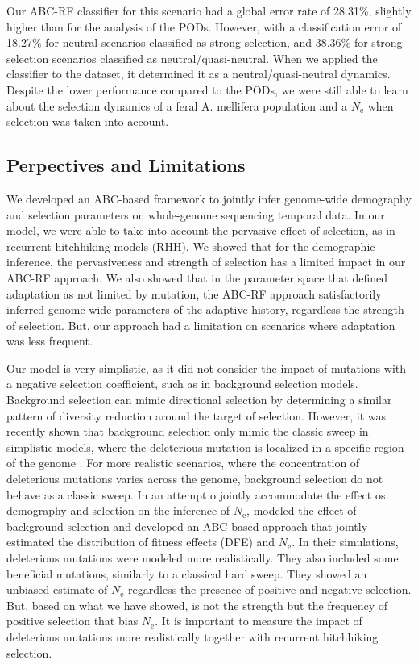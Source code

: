 \documentclass[a4paper, 12pt]{article}
\begin{document}
Our ABC-RF classifier for this scenario had a global error rate of 28.31\%, slightly higher than for the analysis of the PODs. However, with a classification error of 18.27\% for neutral scenarios classified as strong selection, and 38.36\% for strong selection scenarios classified as neutral/quasi-neutral. When we applied the classifier to the dataset, it determined it as a neutral/quasi-neutral dynamics. Despite the lower performance compared to the PODs, we were still able to learn about the selection dynamics of a feral A. mellifera population and a $N_{\mathrm{e}}$ when selection was taken into account.

\subsection*{Perpectives and Limitations}

We developed an ABC-based framework to jointly infer genome-wide demography and selection parameters on whole-genome sequencing temporal data. In our model, we were able to take into account the pervasive effect of selection, as in recurrent hitchhiking models (RHH). We showed that for the demographic inference, the pervasiveness and strength of selection has a limited impact in our ABC-RF approach. We also showed that in the parameter space that defined adaptation as not limited by mutation, the ABC-RF approach satisfactorily inferred genome-wide parameters of the adaptive history, regardless the strength of selection. But, our approach had a limitation on scenarios where adaptation was less frequent. 

Our model is very simplistic, as it did not consider the impact of mutations with a negative selection coefficient, such as in background selection models. Background selection can mimic directional selection by determining a similar pattern of diversity reduction around the target of selection. However, it was recently shown that background selection only mimic the classic sweep in simplistic models, where the deleterious mutation is localized in a specific region of the genome \citep{Schrider:2019ih}. For more realistic scenarios, where the concentration of deleterious mutations varies across the genome, background selection do not behave as a classic sweep. In an attempt o jointly accommodate the effect os demography and selection on the inference of $N_{\mathrm{e}}$,  \citet{Johri:2019jv} modeled the effect of background selection and developed an ABC-based approach that jointly estimated the distribution of fitness effects (DFE) and $N_{\mathrm{e}}$. In their simulations, deleterious mutations were modeled more realistically. They also included some beneficial mutations, similarly to a classical hard sweep. They showed an unbiased estimate of $N_{\mathrm{e}}$ regardless the presence of positive and negative selection. But, based on what we have showed, is not the strength but the frequency of positive selection that bias $N_{\mathrm{e}}$.
It is important to measure the impact of deleterious mutations more realistically together with recurrent hitchhiking selection.
\end{document}
